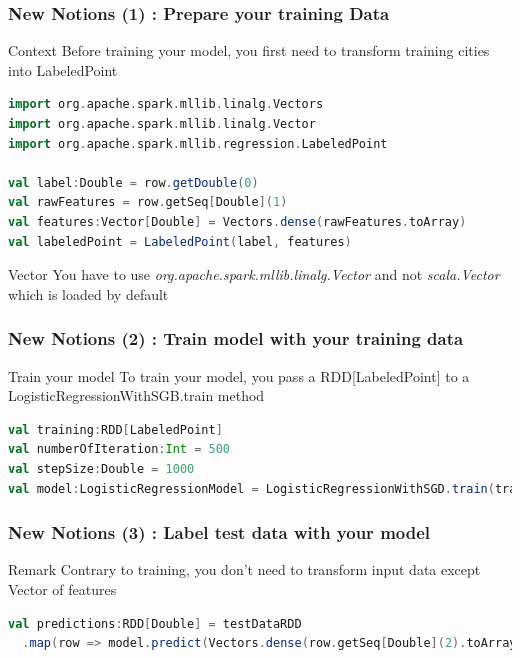 \documentclass[slidetop,9pt,utf8]{beamer}
\begin{document}
\begin{frame}[fragile]
  \frametitle{New Notions (1) : Prepare your training Data}

  \begin{block}{Context}
    Before training your model, you first need to transform training cities into LabeledPoint
  \end{block}

  \begin{lstlisting}[label=TransformDataToLogisticRegression, caption=Transform row into LabeledPoint, language=scala, style=code]
import org.apache.spark.mllib.linalg.Vectors
import org.apache.spark.mllib.linalg.Vector
import org.apache.spark.mllib.regression.LabeledPoint

val label:Double = row.getDouble(0)
val rawFeatures = row.getSeq[Double](1)
val features:Vector[Double] = Vectors.dense(rawFeatures.toArray)
val labeledPoint = LabeledPoint(label, features)
  \end{lstlisting}

\begin{alertblock}{Vector}
  You have to use \textit{org.apache.spark.mllib.linalg.Vector} and not \textit{scala.Vector} which is loaded by default
\end{alertblock}

\end{frame}

\begin{frame}[fragile]
  \frametitle{New Notions (2) : Train model with your training data}

  \begin{block}{Train your model}
    To train your model, you pass a RDD[LabeledPoint] to a LogisticRegressionWithSGB.train method
  \end{block}

  \begin{lstlisting}[label=TrainModel, caption=Train your model, language=scala, style=code]
val training:RDD[LabeledPoint]
val numberOfIteration:Int = 500
val stepSize:Double = 1000
val model:LogisticRegressionModel = LogisticRegressionWithSGD.train(training, 500, 1000)
  \end{lstlisting}

\end{frame}

\begin{frame}[fragile]
  \frametitle{New Notions (3) : Label test data with your model}

  \begin{block}{Remark}
    Contrary to training, you don't need to transform input data except Vector of features
  \end{block}

  \begin{lstlisting}[label=LabelTestData, caption=Label Data with your model, language=scala, style=code]
val predictions:RDD[Double] = testDataRDD
  .map(row => model.predict(Vectors.dense(row.getSeq[Double](2).toArray)))
  \end{lstlisting}

\end{frame}
\end{document}
